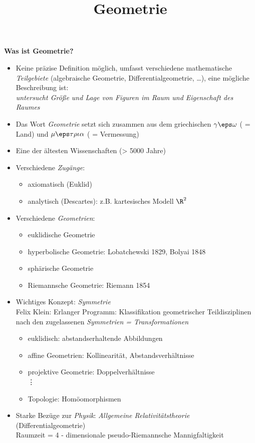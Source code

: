 \documentclass{mycourse}
\title{Geometrie}
\author{}
\begin{document}
\maketitle

\tableofcontents
\newpage

\textbf{Was ist Geometrie?}
\begin{itemize}
	\item
		Keine präzise Definition möglich, umfasst verschiedene mathematische \emph{Teilgebiete} (algebraische Geometrie, Differentialgeometrie, \dots ), eine mögliche Beschreibung ist: \\
		\emph{untersucht Größe und Lage von Figuren im Raum und Eigenschaft des Raumes}
	\item
		Das Wort \emph{Geometrie}  setzt sich zusammen aus dem griechischen $ \gamma \eps \omega $ ( = Land) und $ \mu \eps \tau \rho \iota \alpha$ ( = Vermessung)
	\item
		Eine der ältesten Wissenschaften (> 5000 Jahre)
	\item
		Verschiedene \emph{Zugänge}: 
		\begin{itemize}
			\item axiomatisch (Euklid)
			\item analytisch (Descartes): z.B. kartesisches Modell $\R^2$
		\end{itemize}
	\item
		Verschiedene \emph{Geometrien}:
		\begin{itemize}
			\item euklidische Geometrie
			\item hyperbolische Geometrie: Lobatchewski 1829, Bolyai 1848
			\item sphärische Geometrie
			\item Riemannsche Geometrie: Riemann 1854
		\end{itemize}
	\item 
		Wichtiges Konzept: \emph{Symmetrie} \\
		Felix Klein: Erlanger Programm: Klassifikation geometrischer Teildisziplinen nach den zugelassenen \emph{Symmetrien = Transformationen}
		\begin{itemize}
			\item euklidisch: abstandserhaltende Abbildungen
			\item affine Geometrien: Kollinearität, Abstandsverhältnisse
			\item projektive Geometrie: Doppelverhältnisse \\
				 \vdots
			\item Topologie: Homöomorphismen
		\end{itemize}
	\item
		Starke Bezüge zur \emph{Physik}: \emph{Allgemeine Relativitätstheorie} (Differentialgeometrie) \\
		Raumzeit = 4 - dimensionale pseudo-Riemannsche Mannigfaltigkeit
\end{itemize}
\end{document}
